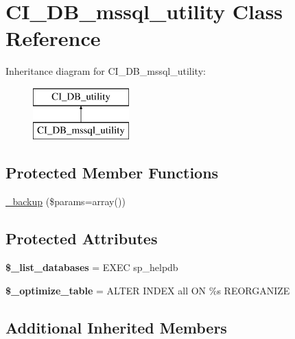 \hypertarget{class_c_i___d_b__mssql__utility}{}\section{C\+I\+\_\+\+D\+B\+\_\+mssql\+\_\+utility Class Reference}
\label{class_c_i___d_b__mssql__utility}
Inheritance diagram for C\+I\+\_\+\+D\+B\+\_\+mssql\+\_\+utility\+:\begin{figure}[H]
\begin{center}
\leavevmode
\includegraphics[height=2.000000cm]{class_c_i___d_b__mssql__utility}
\end{center}
\end{figure}
\subsection*{Protected Member Functions}
\begin{DoxyCompactItemize}
\item 
\mbox{\hyperlink{class_c_i___d_b__mssql__utility_a9ea0ba3b9d0e7829010bcd3601dbb60f}{\+\_\+backup}} (\$params=array())
\end{DoxyCompactItemize}
\subsection*{Protected Attributes}
\begin{DoxyCompactItemize}
\item 
\mbox{\label{class_c_i___d_b__mssql__utility_a3faa72643c9191db5db5f6c4767a4690}} 
{\bfseries \$\+\_\+list\+\_\+databases} = \textquotesingle{}E\+X\+EC sp\+\_\+helpdb\textquotesingle{}
\item 
\mbox{\label{class_c_i___d_b__mssql__utility_a2812d6239f65efc0eeff8b9a66fa8a05}} 
{\bfseries \$\+\_\+optimize\+\_\+table} = \textquotesingle{}A\+L\+T\+ER I\+N\+D\+EX all ON \%s R\+E\+O\+R\+G\+A\+N\+I\+ZE\textquotesingle{}
\end{DoxyCompactItemize}
\subsection*{Additional Inherited Members}


